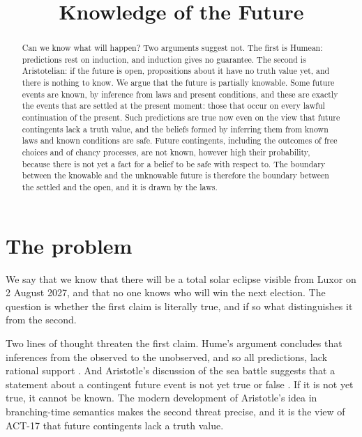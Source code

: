 \documentclass{situationist-preprint}
\title{Knowledge of the Future}
\begin{document}
\maketitle

\begin{abstract}
Can we know what will happen? Two arguments suggest not. The first is Humean: predictions rest on induction, and induction gives no guarantee. The second is Aristotelian: if the future is open, propositions about it have no truth value yet, and there is nothing to know. We argue that the future is partially knowable. Some future events are known, by inference from laws and present conditions, and these are exactly the events that are settled at the present moment: those that occur on every lawful continuation of the present. Such predictions are true now even on the view that future contingents lack a truth value, and the beliefs formed by inferring them from known laws and known conditions are safe. Future contingents, including the outcomes of free choices and of chancy processes, are not known, however high their probability, because there is not yet a fact for a belief to be safe with respect to. The boundary between the knowable and the unknowable future is therefore the boundary between the settled and the open, and it is drawn by the laws.
\end{abstract}

\section{The problem}

We say that we know that there will be a total solar eclipse visible from Luxor on 2 August 2027, and that no one knows who will win the next election. The question is whether the first claim is literally true, and if so what distinguishes it from the second.

Two lines of thought threaten the first claim. Hume's argument concludes that inferences from the observed to the unobserved, and so all predictions, lack rational support \citep[\S IV]{Hume1748}. And Aristotle's discussion of the sea battle suggests that a statement about a contingent future event is not yet true or false \citep[ch.~9]{AristotleDeInt}. If it is not yet true, it cannot be known. The modern development of Aristotle's idea in branching-time semantics \citep{Prior1967,Thomason1970} makes the second threat precise, and it is the view of ACT-17 that future contingents lack a truth value.
\end{document}
